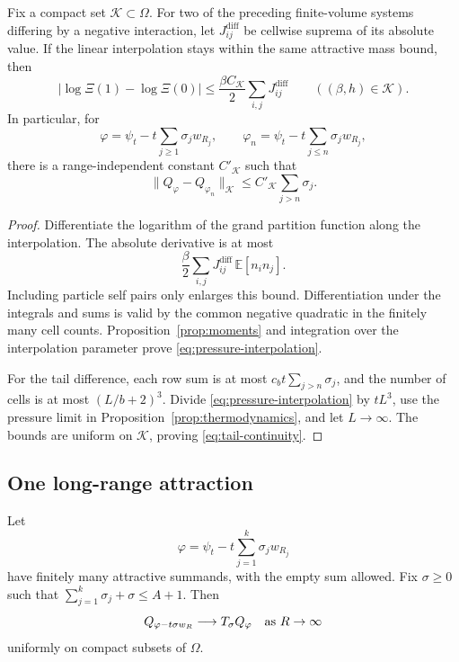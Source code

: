 \begin{proposition}\label{prop:tail}
Fix a compact set \(\mathcal K\subset\Omega\).
For two of the preceding finite-volume systems differing by a negative
interaction, let \(J^{\mathrm{diff}}_{ij}\) be cellwise suprema of its
absolute value.  If the linear interpolation stays within the same
attractive mass bound, then
\begin{equation}\label{eq:pressure-interpolation}
 |\log\Xi(1)-\log\Xi(0)|
 \le \frac{\beta C_{\mathcal K}}2\sum_{i,j}J^{\mathrm{diff}}_{ij}
 \qquad ((\beta,h)\in\mathcal K).
\end{equation}
In particular, for
\[
 \varphi=\psi_t-t\sum_{j\ge1}\sigma_jw_{R_j},
 \qquad
 \varphi_n=\psi_t-t\sum_{j\le n}\sigma_jw_{R_j},
\]
there is a range-independent constant \(C'_{\mathcal K}\) such that
\begin{equation}\label{eq:tail-continuity}
 \|Q_\varphi-Q_{\varphi_n}\|_{\mathcal K}
 \le C'_{\mathcal K}\sum_{j>n}\sigma_j .
\end{equation}
\end{proposition}

\begin{proof}
Differentiate the logarithm of the grand partition function along the
interpolation.  The absolute derivative is at most
\[
 \frac{\beta}{2}\sum_{i,j}J^{\mathrm{diff}}_{ij}\,
                 \mathbb E[n_i n_j].
\]
Including particle self pairs only enlarges this bound.  Differentiation
under the integrals and sums is valid by the common negative quadratic
in the finitely many cell counts.  Proposition~\ref{prop:moments} and
integration over the interpolation parameter prove
\eqref{eq:pressure-interpolation}.

For the tail difference, each row sum is at most
\(c_b t\sum_{j>n}\sigma_j\), and the number of cells is at most
\((L/b+2)^3\).  Divide \eqref{eq:pressure-interpolation} by \(tL^3\),
use the pressure limit in Proposition~\ref{prop:thermodynamics}, and let
\(L\to\infty\).  The bounds are uniform on \(\mathcal K\), proving
\eqref{eq:tail-continuity}.
\end{proof}

\subsection{One long-range attraction}

\begin{proposition}\label{prop:kac}
Let
\[
 \varphi=\psi_t-t\sum_{j=1}^k\sigma_jw_{R_j}
\]
have finitely many attractive summands, with the empty sum allowed.
Fix \(\sigma\ge0\) such that \(\sum_{j=1}^k\sigma_j+\sigma\le A+1\).
Then
\begin{equation}\label{eq:kac-limit}
 Q_{\varphi-t\sigma w_R}\longrightarrow T_\sigma Q_\varphi
 \quad\text{as }R\to\infty
\end{equation}
uniformly on compact subsets of \(\Omega\).
\end{proposition}

